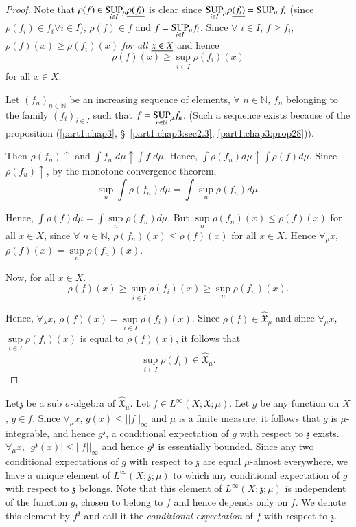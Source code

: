 \begin{proof}
Note that $\rho(f) \in \underset{i\in I}{\operatorname{SUP}} {}_\mu \underline{\rho(f_i)}$
is clear since $\underset{i\in I}{\operatorname{SUP}}{}_\mu \rho \underline{(f_i)} =
\operatorname{SUP}_\mu f_i$ (since $\rho(f_i) \in f_i \forall i \in I$), $\rho(f)
\in f$ and $f = \underset{i \in I}{\operatorname{SUP}}{}_\mu f_i$. Since $\forall$
$i \in I$, $f \geq f_i$, $\rho(f) (x) \geq \rho (f_i) (x)$ {\em for
  all} $\underline{x \in X}$ and hence
$$
\rho(f) (x) \geq \sup\limits_{i \in I} \rho(f_i) (x)
$$
for all $x \in X$. 

Let $(f_n)_{n\in \mathbb{N}}$ be an increasing sequence of elements,
$\forall$ $n \in\mathbb{N}$, $f_n$ belonging to the family
$(f_i)_{i\in I}$ such that $f = \underset{n \in \mathbb{N}}{\operatorname{SUP}}
{}_\mu f_n$. (Such a sequence exists because of the proposition (\ref{part1:chap3},
\S\ \ref{part1:chap3:sec2.3}, \ref{part1:chap3:prop28})). 

Then $\rho(f_n) \uparrow$ and $\int f_n \; d \mu \uparrow \int f \; d
\mu$. Hence,  $\int \rho(f_n) d\mu \uparrow \int \rho(f) d\mu$. Since
$\rho(f_u) \uparrow$, by the monotone convergence theorem,
$$
\sup\limits_n \int \rho(f_n) d \mu = \int \sup\limits_n \rho(f_n) d
\mu. 
$$

Hence, $\int \rho (f) d \mu = \int \sup\limits_n \rho(f_n) d\mu$. But
$\sup\limits_n \rho(f_n) (x) \leq \rho(f) (x)$ for all $x \in X$,
since $\forall$ $n \in \mathbb{N}$, $\rho(f_n) (x) \leq \rho(f)(x)$
for all $x \in X$. Hence $\forall_\mu x$, $\rho(f)(x) = \sup\limits_n
\rho(f_n)(x)$. 

Now, for all $x \in X$. 
$$
\rho(f) (x) \geq \sup\limits_{i \in I} \rho (f_i) (x) \geq
\sup\limits_n \rho (f_n)(x). 
$$ 

Hence, $\forall_\lambda x$, $\rho(f)(x) = \sup\limits_{i \in I}
\rho(f_i) (x)$. Since $\rho(f) \in \hat{\mathfrak{X}}_\mu$ and since
$\forall_\mu x$, $\sup\limits_{i\in I} \rho(f_i) (x) $ is equal to
$\rho(f) (x)$, it follows that
$$
\sup\limits_{i \in I} \rho(f_i) \in\hat{\mathfrak{X}}_\mu. 
$$
\end{proof}

Let\pageoriginale $\mathfrak{z}$ be a sub $\sigma$-algebra of
$\hat{\mathfrak{X}}_\mu$. Let $f \in L^\infty (X; \mathfrak{X}; \mu)$. Let
$g$ be any function on $X$, $g \in f$. Since $\forall_\mu x$, $g(x)
\leq ||f||_\infty$ and $\mu$ is a finite measure, it follows that $g$
is $\mu$-integrable, and hence $g^\mathfrak{z}$, a conditional
expectation of $g$ with respect to $\mathfrak{z}$ exists. $\forall_\mu
x$, $|g^\mathfrak{z}(x)| \leq ||f||_\infty$ and hence $g^\mathfrak{z}$
is essentially bounded. Since any two conditional expectations of $g$
with respect to $\mathfrak{z}$ are equal $\mu$-almost everywhere, we
have a unique element of $L^\infty (X; \mathfrak{z}; \mu)$ to which
any conditional expectation of $g$ with respect to $\mathfrak{z}$
belongs. Note that this element of $L^\infty(X; \mathfrak{z}; \mu)$ is
independent of the function $g$, chosen to belong to $f$ and hence
depends only on $f$. We denote this element by $f^\mathfrak{z}$ and
call it the \textit{conditional expectation} of $f$ with respect to
$\mathfrak{z}$. 

